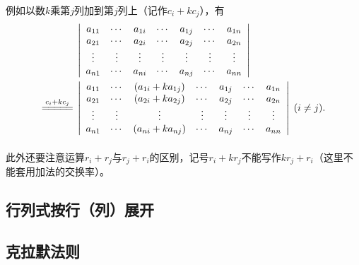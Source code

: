 \paragraph{}
例如以数$k$乘第$j$列加到第$j$列上（记作$c_i+kc_j$），有
\begin{align*}
  &\;\left|\begin{array}{ccccccc}
    a_{11} & \cdots & a_{1i} & \cdots & a_{1j} & \cdots & a_{1n} \\
    a_{21} & \cdots & a_{2i} & \cdots & a_{2j} & \cdots & a_{2n} \\
    \vdots & \vdots & \vdots & \vdots & \vdots & \vdots & \vdots \\
    a_{n1} & \cdots & a_{ni} & \cdots & a_{nj} & \cdots & a_{nn}
  \end{array}\right| \\
  \stackrel{c_i+kc_j}{=\joinrel=\joinrel=\joinrel=\joinrel=} &\;\left|\begin{array}{ccccccc}
    a_{11} & \cdots & (a_{1i} + ka_{1j}) & \cdots & a_{1j} & \cdots & a_{1n} \\
    a_{21} & \cdots & (a_{2i} + ka_{2j}) & \cdots & a_{2j} & \cdots & a_{2n} \\
    \vdots & \vdots & \vdots & \vdots & \vdots & \vdots & \vdots \\
    a_{n1} & \cdots & (a_{ni} + ka_{nj}) & \cdots & a_{nj} & \cdots & a_{nn}
  \end{array}\right| \; (i \neq j).
\end{align*}

\paragraph{}
此外还要注意运算$r_i + r_j$与$r_j + r_i$的区别，记号$r_i + kr_j$不能写作$kr_j + r_i$（这里不能套用加法的交换率）。

\subsection{行列式按行（列）展开}

\subsection{克拉默法则}
